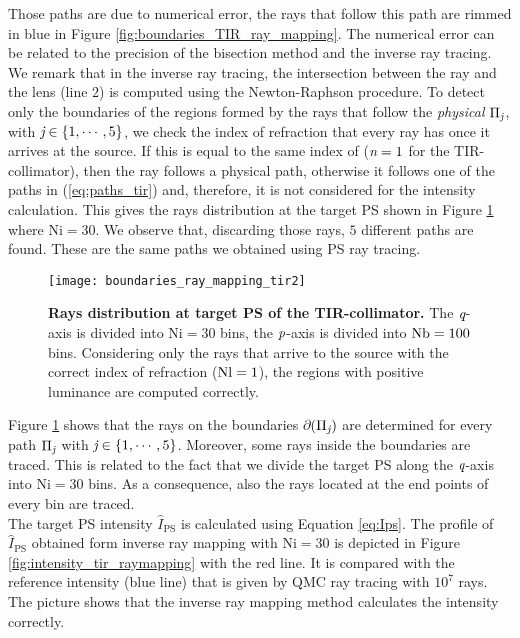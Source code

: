 Those paths are due to numerical error, the rays that follow this path are rimmed in blue in Figure \ref{fig:boundaries_TIR_ray_mapping}. The numerical error can be related to the precision of the bisection method and the inverse ray tracing. We remark that in the inverse ray tracing, the intersection between the ray and the lens (line $2$) is computed using the Newton-Raphson procedure.
To detect only the boundaries of the regions formed by the rays that follow the \textit{physical} $\Pi_{\textit{j}}$, with $\textit{j}\in\{1, \cdots, 5\}$, we check the index of refraction that every ray has once it arrives at the source.
If this is equal to the same index of  ($\textit{n}=1$ for the TIR-collimator), then the ray follows a physical path, otherwise it follows one of the paths in (\ref{eq:paths_tir}) and, therefore, it is not considered for the intensity calculation. This gives the rays distribution at the target PS shown in Figure \ref{fig:boundaries_TIR_ray_mapping1} where $\textrm{Ni}=30$. We observe that, discarding those rays, $5$ different paths are found. These are the same paths we obtained using PS ray tracing.
\begin{figure}[h]
  \begin{center}
  \texttt{[image: boundaries\_ray\_mapping\_tir2]}
  \end{center}
  \caption{\textbf{Rays distribution at target PS of the TIR-collimator.}
 The $\textit{q}$-axis is divided into $\textrm{Ni}=30$ bins, the $\textit{p}$-axis is divided into $\textrm{Nb} = 100$ bins. Considering only the rays that arrive to the source with the correct index of refraction ($\textrm{Nl}=1$), the regions with positive luminance are computed correctly.}
\label{fig:boundaries_TIR_ray_mapping1}
 \end{figure}
Figure \ref{fig:boundaries_TIR_ray_mapping1} shows that the rays on the boundaries $\partial$$(\Pi_{\textit{j}})$ are determined for every path $\Pi_{\textit{j}}$ with $\textit{j}\in\{1, \cdots, 5\}$. Moreover, some rays inside the boundaries are traced. This is related to the fact that we divide the target PS along the $\textit{q}$-axis into $\textrm{Ni}=30$ bins. As a consequence, also the rays located at the end points of every bin are traced. \\
\indent The target PS intensity $\hat{I}_{\textrm{PS}}$ is calculated using Equation \ref{eq:Ips}. The profile of $\hat{I}_{\textrm{PS}}$ obtained form inverse ray mapping with $\textrm{Ni}=30$ is depicted in Figure \ref{fig:intensity_tir_raymapping} with the red line. It is compared with the reference intensity (blue line) that is given by QMC ray tracing with $10^7$ rays. The picture shows that the inverse ray mapping method calculates the intensity correctly.
